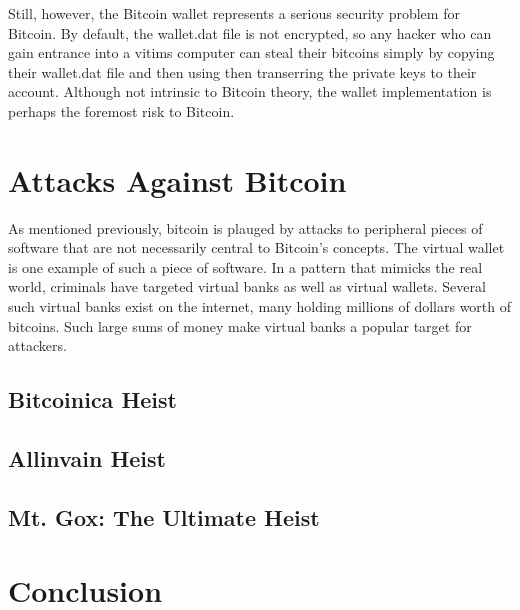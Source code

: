 \documentclass{report}
\begin{document}
Still, however, the Bitcoin wallet represents a serious security problem for Bitcoin.  
By default, the wallet.dat file is not encrypted, so any hacker who can gain entrance 
into a vitims computer can steal their bitcoins simply by copying their wallet.dat file 
and then using then transerring the private keys to their account.  Although not intrinsic 
to Bitcoin theory, the wallet implementation is perhaps the foremost risk to Bitcoin.

\section*{Attacks Against Bitcoin}
As mentioned previously, bitcoin is plauged by attacks to peripheral pieces of software 
that are not necessarily central to Bitcoin's concepts.  The virtual wallet is one example
of such a piece of software.  In a pattern that mimicks the real world, criminals have
targeted virtual banks as well as virtual wallets.  Several such virtual banks exist on
the internet, many holding millions of dollars worth of bitcoins.  Such large sums of 
money make virtual banks a popular target for attackers.

\subsection*{Bitcoinica Heist}

\subsection*{Allinvain Heist}
\subsection*{Mt. Gox: The Ultimate Heist}

\section*{Conclusion}

{}

\end{document}
